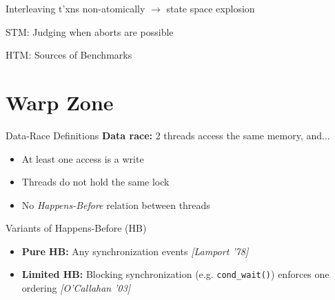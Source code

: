 \documentclass[xcolor=dvipsnames]{beamer}
\begin{document}
\begin{frame}{Interleaving t'xns non-atomically $\rightarrow$ state space explosion}
\end{frame}

\begin{frame}{STM: Judging when aborts are possible}
\end{frame}

\begin{frame}{HTM: Sources of Benchmarks}
\end{frame}


\section{Warp Zone}


\begin{frame}{Data-Race Definitions}
	\textbf{Data race:} 2 threads access the same memory, and...
	\begin{itemize}
		\item At least one access is a write
		\item Threads do not hold the same lock
		\item No {\em Happens-Before} relation between threads
	\end{itemize}
	\pause
	\linegap

	Variants of Happens-Before (HB)
	\begin{itemize}
		\item {\bf Pure HB:} Any synchronization events {\em [Lamport '78]}
		\item {\bf Limited HB:} Blocking synchronization (e.g. \texttt{cond\_wait()}) enforces one ordering {\em [O'Callahan '03]}
	\end{itemize}
\end{frame}
\end{document}
